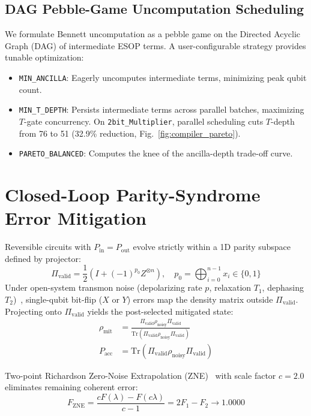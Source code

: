 \documentclass[10pt,twocolumn,letterpaper]{article}
\begin{document}
\subsection{DAG Pebble-Game Uncomputation Scheduling}
We formulate Bennett uncomputation as a pebble game on the Directed Acyclic Graph (DAG) of intermediate ESOP terms. A user-configurable strategy provides tunable optimization:
\begin{itemize}[leftmargin=1.15em, itemsep=0.5pt]
    \item \texttt{MIN\_ANCILLA}: Eagerly uncomputes intermediate terms, minimizing peak qubit count.
    \item \texttt{MIN\_T\_DEPTH}: Persists intermediate terms across parallel batches, maximizing $T$-gate concurrency. On \texttt{2bit\_Multiplier}, parallel scheduling cuts $T$-depth from 76 to 51 (32.9\% reduction, Fig.~\ref{fig:compiler_pareto}).
    \item \texttt{PARETO\_BALANCED}: Computes the knee of the ancilla-depth trade-off curve.
\end{itemize}

\section{Closed-Loop Parity-Syndrome Error Mitigation}
Reversible circuits with $P_{\text{in}} = P_{\text{out}}$ evolve strictly within a 1D parity subspace defined by projector:
\begin{equation}
    \Pi_{\text{valid}} = \frac{1}{2}\left(I + (-1)^{p_0} Z^{\otimes n}\right), \quad p_0 = \bigoplus_{i=0}^{n-1} x_i \in \{0, 1\}
\end{equation}
Under open-system transmon noise (depolarizing rate $p$, relaxation $T_1$, dephasing $T_2$)~\cite{koch2007transmon}, single-qubit bit-flip ($X$ or $Y$) errors map the density matrix outside $\Pi_{\text{valid}}$. Projecting onto $\Pi_{\text{valid}}$ yields the post-selected mitigated state:
\begin{align}
    \rho_{\text{mit}} &= \frac{\Pi_{\text{valid}} \rho_{\text{noisy}} \Pi_{\text{valid}}}{\text{Tr}(\Pi_{\text{valid}} \rho_{\text{noisy}} \Pi_{\text{valid}})} \\
    P_{\text{acc}} &= \text{Tr}(\Pi_{\text{valid}} \rho_{\text{noisy}} \Pi_{\text{valid}})
\end{align}

Two-point Richardson Zero-Noise Extrapolation (ZNE)~\cite{temme2017zne} with scale factor $c=2.0$ eliminates remaining coherent error:
\begin{equation}
    F_{\text{ZNE}} = \frac{c F(\lambda) - F(c\lambda)}{c - 1} = 2 F_1 - F_2 \longrightarrow 1.0000
\end{equation}
\end{document}
